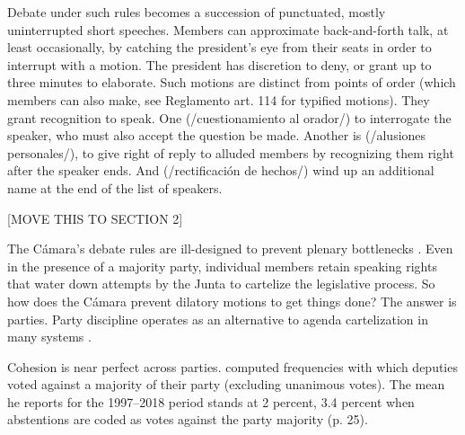 \documentclass[letter,12pt]{article}
\begin{document}
Debate under such rules becomes a succession of punctuated, mostly uninterrupted short speeches. Members can approximate back-and-forth talk, at least occasionally, by catching the president's eye from their seats in order to interrupt with a motion. The president has discretion to deny, or grant up to three minutes to elaborate. Such motions are distinct from points of order (which members can also make, see Reglamento art. 114 for typified motions). They grant recognition to speak. One (/cuestionamiento al orador/) to interrogate the speaker, who must also accept the question be made. Another is (/alusiones personales/), to give right of reply to alluded members by recognizing them right after the speaker ends. And (/rectificación de hechos/) wind up an additional name at the end of the list of speakers. 


[MOVE THIS TO SECTION 2]

The Cámara's debate rules are ill-designed to prevent plenary bottlenecks \citep{cox.2006}. Even in the presence of a majority party, individual members retain speaking rights that water down attempts by the Junta to cartelize the legislative process. So how does the Cámara prevent dilatory motions to get things done? The answer is parties. Party discipline operates as an alternative to agenda cartelization in many systems \citep{prata.2006}. 

Cohesion is near perfect across parties. \citet{tellez-del-rio.2018} computed frequencies with which deputies voted against a majority of their party (excluding unanimous votes). The mean he reports for the 1997--2018 period stands at 2 percent, 3.4 percent when abstentions are coded as votes against the party majority (p. 25). 
\end{document}
